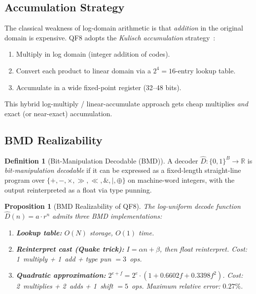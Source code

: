 \documentclass[11pt,letterpaper]{article}
\newtheorem{proposition}[theorem]{Proposition}
\theoremstyle{definition}
\newtheorem{definition}[theorem]{Definition}
\theoremstyle{remark}
\newcommand{\R}{\mathbb{R}}
\begin{document}
\subsection{Accumulation Strategy}
\label{subsec:accumulation}

The classical weakness of log-domain arithmetic is that \emph{addition} in the
original domain is expensive.
QF8 adopts the \emph{Kulisch accumulation} strategy~\cite{johnson2018}:
\begin{enumerate}[leftmargin=2em]
  \item Multiply in log domain (integer addition of codes).
  \item Convert each product to linear domain via a $2^4 = 16$-entry lookup
    table.
  \item Accumulate in a wide fixed-point register (32--48 bits).
\end{enumerate}
This hybrid log-multiply / linear-accumulate approach gets cheap multiplies
\emph{and} exact (or near-exact) accumulation.

\subsection{BMD Realizability}

\begin{definition}[Bit-Manipulation Decodable (BMD)]
\label{def:bmd}
A decoder $\hat{D}: \{0,1\}^B \to \R$ is \emph{bit-manipulation decodable}
if it can be expressed as a fixed-length straight-line program over
$\{+, -, \times, \gg, \ll, \mathbin{\&}, |, \oplus\}$ on machine-word
integers, with the output reinterpreted as a float via type punning.
\end{definition}

\begin{proposition}[BMD Realizability of QF8]
\label{prop:bmd}
The log-uniform decode function $\hat{D}(n) = a \cdot r^n$ admits three
BMD implementations:
\begin{enumerate}[leftmargin=2em]
  \item \textbf{Lookup table:} $O(N)$ storage, $O(1)$ time.
  \item \textbf{Reinterpret cast (Quake trick):} $I = \alpha n + \beta$, then
    float reinterpret.
    Cost: 1~multiply + 1~add + type pun $= 3$~ops.
  \item \textbf{Quadratic approximation:}
    $2^{e+f} = 2^e \cdot (1 + 0.6602f + 0.3398f^2)$.
    Cost: 2~multiplies + 2~adds + 1~shift $= 5$~ops.
    Maximum relative error: $0.27\%$.
\end{enumerate}
\end{proposition}
\end{document}
